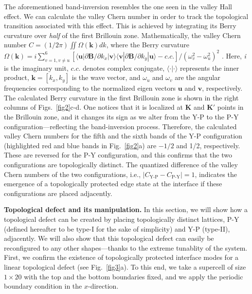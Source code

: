 \documentclass[aps,preprint,onecolumn,showpacs,superscriptaddress,groupedaddress]{revtex4}  %
\begin{document}
The aforementioned band-inversion resembles the one seen in the valley Hall effect. We can calculate the valley Chern number in order to track the topological transition associated with this effect. This is achieved by integrating its Berry curvature over \textit{half} of the first Brillouin zone. Mathematically, the valley Chern number $C=(1/2\pi) \iint \Omega(\mathbf{k})dk $, where the Berry curvature $\Omega(\mathbf{k})=i \sum_{v=1, v \neq u }^{6} \left[ \langle \mathbf{u} | \partial{\mathbf{B}}/\partial{k}_x| \mathbf{v} \rangle  \langle \mathbf{v} | \partial{\mathbf{B}}/\partial{k}_y| \mathbf{u} \rangle - c.c. \right]/ (\omega_v^2-\omega_u^2)^2$ \citep{39}. Here, \textit{i} is the imaginary unit, $c.c.$ denotes complex conjugate, $\langle \cdot | \cdot \rangle$ represents the inner product, $\mathbf{k}=[k_x, k_y]$ is the wave vector, and $\omega_u$ and $\omega_v$ are the angular frequencies corresponding to the normalized eigen vectors $\mathbf{u}$ and $\mathbf{v}$, respectively. The calculated Berry curvature in the first Brillouin zone is shown in the right columns of Figs.~\ref{fig2}c-d. One notices that it is localized at \textbf{K} and \textbf{K$'$} points in the Brillouin zone, and it changes its sign as we alter from the Y-P to the P-Y configuration---reflecting the band-inversion process. Therefore, the calculated valley Chern numbers for the fifth and the sixth bands of the Y-P configuration (highlighted red and blue bands in Fig.~\ref{fig2}a) are $-1/2$ and 1/2, respectively. These are reversed for the P-Y configuration, and this confirms that the two configurations are topologically distinct. The quantized difference of the valley Chern numbers of the two configurations, i.e., $|C_{\text{Y-P}}-C_{\text{P-Y}}|=1$, indicates the emergence of a topologically protected edge state at the interface if these configurations are placed adjacently. 
  
\vspace{3ex}

\textbf{Topological defect and its manipulation.} In this section, we will show how a topological defect can be created by placing topologically distinct lattices, P-Y (defined hereafter to be type-I for the sake of simplicity) and Y-P (type-II), adjacently. We will also show that this topological defect can  easily be reconfigured to any other shapes---thanks to the extreme tunablity of the system. First, we confirm the existence of topologically protected interface modes for a linear topological defect (see Fig.~\ref{fig3}a). To this end, we take a supercell of size $1 \times 20$ with the top and the bottom boundaries fixed, and we apply the periodic boundary condition in the $x$-direction. 
\end{document}
